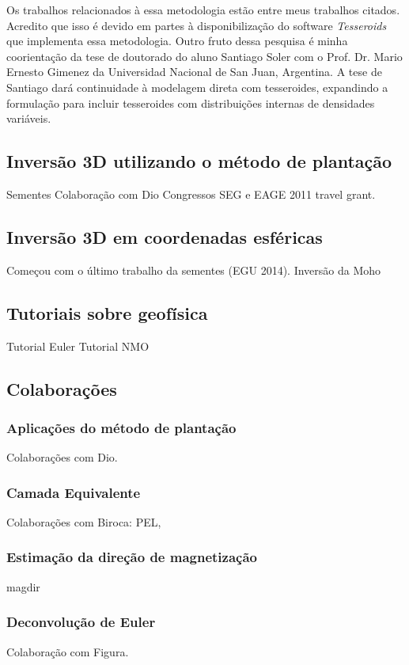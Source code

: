 Os trabalhos relacionados à essa metodologia estão entre meus trabalhos
citados.
Acredito que isso é devido em partes à disponibilização do software
\textit{Tesseroids} que implementa essa metodologia.
Outro fruto dessa pesquisa é minha coorientação da tese de doutorado do aluno
Santiago Soler com o Prof. Dr. Mario Ernesto Gimenez da Universidad Nacional de
San Juan, Argentina.
A tese de Santiago dará continuidade à modelagem direta com tesseroides,
expandindo a formulação para incluir tesseroides com distribuições internas de
densidades variáveis.


\subsection{Inversão 3D utilizando o método de plantação}

Sementes
Colaboração com Dio
Congressos
SEG e EAGE 2011 travel grant.


\subsection{Inversão 3D em coordenadas esféricas}


Começou com o último trabalho da sementes (EGU 2014).
Inversão da Moho


\subsection{Tutoriais sobre geofísica}

Tutorial Euler
Tutorial NMO


\subsection{Colaborações}


\subsubsection{Aplicações do método de plantação}

Colaborações com Dio.


\subsubsection{Camada Equivalente}

Colaborações com Biroca: PEL,


\subsubsection{Estimação da direção de magnetização}

magdir


\subsubsection{Deconvolução de Euler}

Colaboração com Figura.
